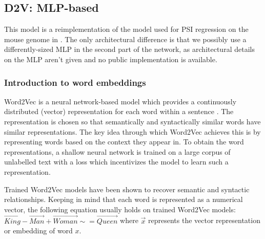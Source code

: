 \subsection{D2V: MLP-based} \label{subsec:d2v}
This model is a reimplementation of the model used for PSI regression on the mouse genome in \cite{d2vsplicing}. The only architectural difference is that we possibly use a differently-sized MLP in the second part of the network, as architectural details on the MLP aren't given and no public implementation is available. 
\subsubsection{Introduction to word embeddings}
Word2Vec is a neural network-based model which provides a continuously distributed (vector) representation for each word within a sentence \cite{w2v1}\cite{w2v2}. The representation is chosen so that semantically and syntactically similar words have similar representations. The key idea through which Word2Vec achieves this is by representing words based on the context they appear in. To obtain the word representations, a shallow neural network is trained on a large corpus of unlabelled text with a loss which incentivizes the model to learn such a representation.

Trained Word2Vec models have been shown to recover semantic and syntactic relationships. Keeping in mind that each word is represented as a numerical vector, the following equation usually holds on trained Word2Vec models: 
$\vec{King} - \vec{Man} + \vec{Woman} \sim = \vec{Queen}$ 
where $\vec{x}$ represents the vector representation or embedding of word $x$.

